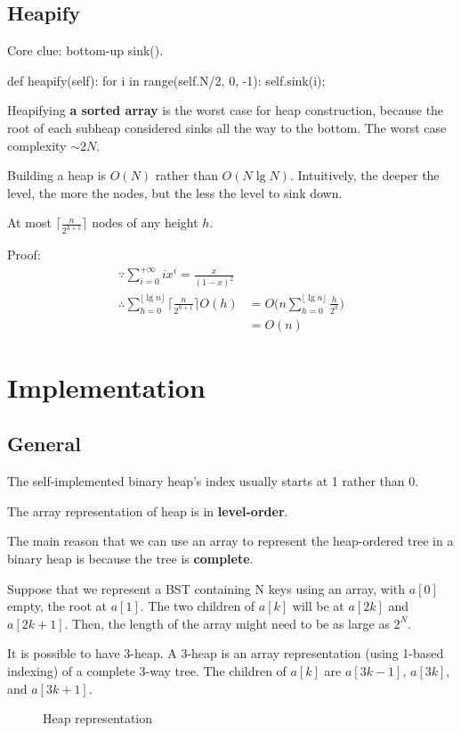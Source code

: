 \subsection{Heapify}
Core clue: bottom-up sink().
\begin{python}
def heapify(self):
    for i in range(self.N/2, 0, -1):
        self.sink(i);
\end{python}
 Heapifying \textbf{a sorted array} is the worst case for heap construction, because the root of each subheap considered sinks all the way to the bottom. The worst case complexity $\sim 2N$. 

Building a heap is $O(N)$ rather than $O(N \lg N)$. Intuitively, the deeper the level, the more the nodes, but the less the level to sink down. 

At most $\big\lceil\frac{n}{2^{h+1}}\big\rceil$ nodes of any height $h$.

Proof:
\begin{align*}
\because \sum_{i=0}^{+\infty} {ix^i} =\frac{x}{(1-x)^2} \\
\therefore \sum_{h=0}^{\lfloor\lg n\rfloor}{\Big\lceil\frac{n}{2^{h+1}}\Big\rceil
O(h)} &= O\Bigg(n\sum_{h=0}^{\lfloor\lg n\rfloor}{\frac{h}{2^h}}\Bigg) \\
&= O(n)
\end{align*}

\section{Implementation}
\subsection{General}
The self-implemented binary heap's index usually starts at 1 rather than 0. 

The array representation of heap is in \textbf{level-order}.

The main reason that we can use an array to represent the heap-ordered tree in a binary heap is because the tree is \textbf{complete}.

Suppose that we represent a BST containing N keys using an array, with $a[0]$ empty, the root at $a[1]$. The two children of $a[k]$ will be at $a[2k]$ and $a[2k+1]$. Then, the length of the array might need to be as large as $2^N$.

It is possible to have 3-heap. A 3-heap is an array representation (using 1-based indexing) of a complete 3-way tree.
The children of $a[k]$ are $a[3k-1]$, $a[3k]$, and $a[3k+1]$.
\begin{figure}[hbtp]
\centering
{}
\caption{Heap representation}
\label{fig:heap} 
\end{figure}

